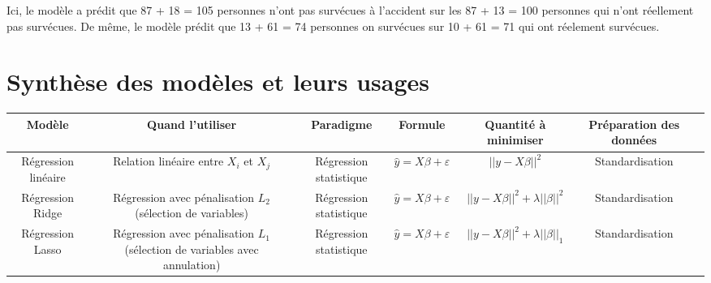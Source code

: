\begin{itemize}
    Ici, le modèle a prédit que 87 + 18 = 105 personnes n'ont pas survécues à l'accident sur les 87 + 13 = 100 personnes qui n'ont réellement pas survécues.
    De même, le modèle prédit que 13 + 61 = 74 personnes on survécues sur 10 + 61 = 71 qui ont réelement survécues. \\

\end{itemize}

\newpage

\chapter{Synthèse des modèles et leurs usages}

\begin{table}[h!]
\scriptsize
\begin{tabularx}{\textwidth}{|C|C|C|C|C|C|C|}
\hline
\textbf{Modèle}                                    & \textbf{Quand l'utiliser}                                                                 & \textbf{Paradigme}                   & \textbf{Formule}                                                                & \textbf{Quantité à minimiser}                                                                      & \textbf{Préparation des données}  \\
\hline

Régression linéaire                                & Relation linéaire entre $X_i$ et $X_j$                                                    & Régression statistique               & $\hat{y} = X\beta + \varepsilon$                                                & $||y - X\beta||^2$                                                                                 & Standardisation \\
\hline

Régression Ridge                                   & Régression avec pénalisation $L_2$ (sélection de variables)                               & Régression statistique               & $\hat{y} = X\beta + \varepsilon$                                                & $||y-X\beta||^2 + \lambda ||\beta||^2$                                                             & Standardisation \\
\hline

Régression Lasso                                   & Régression avec pénalisation $L_1$ (sélection de variables avec annulation)               & Régression statistique               & $\hat{y} = X\beta + \varepsilon$                                                & $||y-X\beta||^2 + \lambda ||\beta||_1$                                                             & Standardisation \\
\hline


\end{tabularx}
\end{table}
